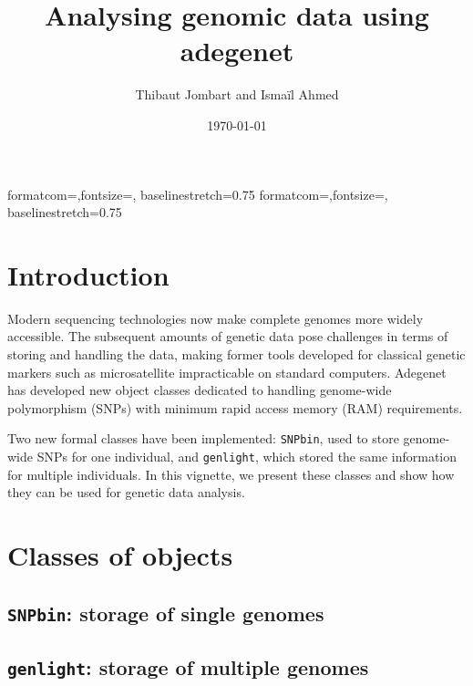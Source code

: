 \documentclass{article}
\title{Analysing genomic data using adegenet}
\author{Thibaut Jombart and Isma\"il Ahmed}
\date{\today}
\newcommand{\code}[1]{{{\tt #1}}}
\begin{document}
{formatcom={\color{Sinput}},fontsize=\footnotesize, baselinestretch=0.75}
{formatcom={\color{Soutput}},fontsize=\footnotesize, baselinestretch=0.75}

\color{black}

\maketitle
\tableofcontents



\section{Introduction}
Modern sequencing technologies now make complete genomes more widely accessible.
The subsequent amounts of genetic data pose challenges in terms of storing and handling the data,
making former tools developed for classical genetic markers such as microsatellite impracticable on
standard computers.
Adegenet has developed new object classes dedicated to handling genome-wide polymorphism (SNPs) with
minimum rapid access memory (RAM) requirements.

Two new formal classes have been implemented: \texttt{SNPbin}, used to store genome-wide SNPs for
one individual, and \texttt{genlight}, which stored the same information for multiple individuals.
In this vignette, we present these classes and show how they can be used for genetic data analysis.





\section{Classes of objects}

\subsection{\code{SNPbin}: storage of single genomes}


\subsection{\code{genlight}: storage of multiple genomes}
\end{document}

